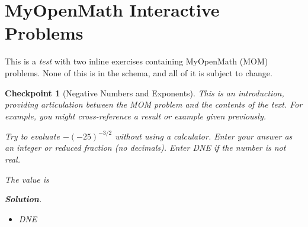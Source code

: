 \documentclass[pdflatex]{sn-jnl}
\theoremstyle{thmstyleone}%
\theoremstyle{thmstyletwo}%
\newtheorem{inlineexercise}[theorem]{Checkpoint}
\theoremstyle{thmstylethree}%
\newcommand{\blocktitlefont}{\relax}
\numberwithin{equation}{section}
\begin{document}
\section{MyOpenMath Interactive Problems}\label{section-myopenmath}%
This is a \emph{test} with two inline exercises containing MyOpenMath (MOM) problems.  None of this is in the schema, and all of it is subject to change.%
\begin{inlineexercise}[Negative Numbers and Exponents]\label{section-myopenmath-3}%
%
This is an introduction, providing articulation between the MOM problem and the contents of the text.  For example, you might cross-reference a result or example given previously.%
\par
Try to evaluate \(\displaystyle-{\left(-{25}\right)}^{{-{3}{/}{2}}}\) without using a calculator. Enter your answer as an integer or reduced fraction (no decimals). Enter DNE if the number is not real.%
\par
The value is   %
\par\smallskip%
\noindent\textbf{\blocktitlefont Solution}.\hypertarget{section-myopenmath-3-3}{}\quad{}%
\begin{itemize}[label=\textbullet]
\item{}DNE%
\end{itemize}
%
\end{inlineexercise}%
\end{document}
